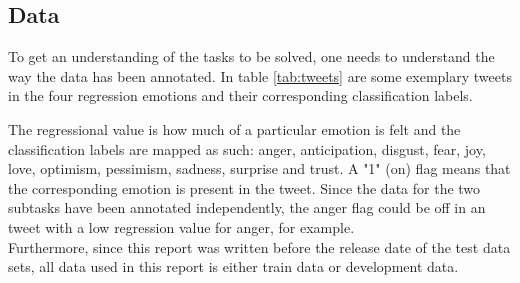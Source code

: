 \subsection{Data} \label{sec:introdata}
To get an understanding of the tasks to be solved, one needs to understand the way the data has been annotated. In table \ref{tab:tweets} are some exemplary tweets in the four regression emotions and their corresponding classification labels.\\
\begin{table}[H]
\caption{Exemplary tweets with regression and classification labels}
\label{tab:tweets}
\end{table}
The regressional value is how much of a particular emotion is felt and the classification labels are mapped as such: anger, anticipation, disgust, fear, joy, love, optimism, pessimism, sadness, surprise and trust. A "1" (on) flag means that the corresponding emotion is present in the tweet. Since the data for the two subtasks have been annotated independently, the anger flag could be off in an tweet with a low regression value for anger, for example. \\
Furthermore, since this report was written before the release date of the test data sets, all data used in this report is either train data or development data.